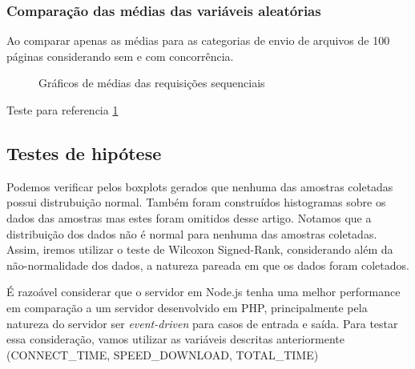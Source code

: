 \documentclass[conference,compsoc]{IEEEtran}
\begin{document}
\subsubsection{Comparação das médias das variáveis aleatórias}
Ao comparar apenas as médias para as categorias de envio de arquivos de 100 páginas considerando sem e com concorrência.
\\
\begin{figure}

\caption{Gráficos de médias das requisições sequenciais}
\label{fig:bar_chart_sequential}
\end{figure}

Teste para referencia \ref{fig:bar_chart_sequential}

\subsection{Testes de hipótese}
Podemos verificar pelos boxplots gerados que nenhuma das amostras coletadas possui distrubuição normal. Também foram construídos histogramas sobre os dados das amostras mas estes foram omitidos desse artigo. Notamos que a distribuição dos dados não é normal para nenhuma das amostras coletadas. Assim, iremos utilizar o teste de Wilcoxon Signed-Rank, considerando além da não-normalidade dos dados, a natureza pareada em que os dados foram coletados.

É razoável considerar que o servidor em Node.js tenha uma melhor performance em comparação a um servidor desenvolvido em PHP, principalmente pela natureza do servidor ser \textit{event-driven} para casos de entrada e saída. Para testar essa consideração, vamos utilizar as variáveis descritas anteriormente (CONNECT\_TIME, SPEED\_DOWNLOAD, TOTAL\_TIME)
\end{document}
